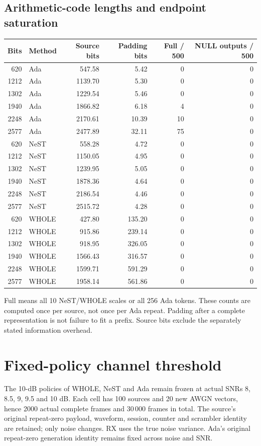 \documentclass[10pt,letterpaper]{article}
\begin{document}
\subsection{Arithmetic-code lengths and endpoint saturation}
\begin{longtable}{@{}rlrrrr@{}}\toprule
Bits & Method & Source bits & Padding bits & Full / 500 & NULL outputs / 500\\\midrule\endhead
620 & Ada & 547.58 & 5.42 & 0 & 0\\
1212 & Ada & 1139.70 & 5.30 & 0 & 0\\
1302 & Ada & 1229.54 & 5.46 & 0 & 0\\
1940 & Ada & 1866.82 & 6.18 & 4 & 0\\
2248 & Ada & 2170.61 & 10.39 & 10 & 0\\
2577 & Ada & 2477.89 & 32.11 & 75 & 0\\
620 & NeST & 558.28 & 4.72 & 0 & 0\\
1212 & NeST & 1150.05 & 4.95 & 0 & 0\\
1302 & NeST & 1239.95 & 5.05 & 0 & 0\\
1940 & NeST & 1878.36 & 4.64 & 0 & 0\\
2248 & NeST & 2186.54 & 4.46 & 0 & 0\\
2577 & NeST & 2515.72 & 4.28 & 0 & 0\\
620 & WHOLE & 427.80 & 135.20 & 0 & 0\\
1212 & WHOLE & 915.86 & 239.14 & 0 & 0\\
1302 & WHOLE & 918.95 & 326.05 & 0 & 0\\
1940 & WHOLE & 1566.43 & 316.57 & 0 & 0\\
2248 & WHOLE & 1599.71 & 591.29 & 0 & 0\\
2577 & WHOLE & 1958.14 & 561.86 & 0 & 0\\
\bottomrule\end{longtable}
Full means all 10 NeST/WHOLE scales or all 256 Ada tokens. These counts are computed once per source, not once per Ada repeat. Padding after a complete representation is not failure to fit a prefix. Source bits exclude the separately stated information overhead.


\section{Fixed-policy channel threshold}\label{sup:5}
The 10-dB policies of WHOLE, NeST and Ada remain frozen at actual SNRs 8, 8.5, 9, 9.5 and 10 dB. Each cell has 100 sources and 20 new AWGN vectors, hence 2000 actual complete frames and 30\,000 frames in total. The source's original repeat-zero payload, waveform, session, counter and scrambler identity are retained; only noise changes. RX uses the true noise variance. Ada's original repeat-zero generation identity remains fixed across noise and SNR.
\end{document}

